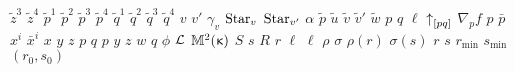 \documentclass[oneside]{book}
\begin{document}
$\tilde z^3$%
\stopmpxshipout
\mpxshipout%
$\tilde z^4$%
\stopmpxshipout
\mpxshipout%
$\tilde p^1$%
\stopmpxshipout
\mpxshipout%
$\tilde p^2$%
\stopmpxshipout
\mpxshipout%
$\tilde p^3$%
\stopmpxshipout
\mpxshipout%
$\tilde p^4$%
\stopmpxshipout
\mpxshipout%
$\tilde q^1$%
\stopmpxshipout
\mpxshipout%
$\tilde q^2$%
\stopmpxshipout
\mpxshipout%
$\tilde q^3$%
\stopmpxshipout
\mpxshipout%
$\tilde q^4$%
\stopmpxshipout
\mpxshipout%
$v$%
\stopmpxshipout
\mpxshipout%
$v'$%
\stopmpxshipout
\mpxshipout%
$\gamma_v$%
\stopmpxshipout
\mpxshipout%
$\mathop{\rm Star}\nolimits_v$%
\stopmpxshipout
\mpxshipout%
$\mathop{\rm Star}\nolimits_{v'}$%
\stopmpxshipout
\mpxshipout%
$\alpha$%
\stopmpxshipout
\mpxshipout%
$\tilde p$%
\stopmpxshipout
\mpxshipout%
$\tilde u$%
\stopmpxshipout
\mpxshipout%
$\tilde v$%
\stopmpxshipout
\mpxshipout%
$\tilde v'$%
\stopmpxshipout
\mpxshipout%
$\tilde w$%
\stopmpxshipout
\mpxshipout%
$p$%
\stopmpxshipout
\mpxshipout%
$q$%
\stopmpxshipout
\mpxshipout%
$\ell$%
\stopmpxshipout
\mpxshipout%
${\uparrow}_{[{p}{q}]}$%
\stopmpxshipout
\mpxshipout%
$\nabla_p f$%
\stopmpxshipout
\mpxshipout%
$p$%
\stopmpxshipout
\mpxshipout%
$\bar p$%
\stopmpxshipout
\mpxshipout%
$x^i$%
\stopmpxshipout
\mpxshipout%
$\bar x^i$%
\stopmpxshipout
\mpxshipout%
$x$%
\stopmpxshipout
\mpxshipout%
$y$%
\stopmpxshipout
\mpxshipout%
$z$%
\stopmpxshipout
\mpxshipout%
$p$%
\stopmpxshipout
\mpxshipout%
$q$%
\stopmpxshipout
\mpxshipout%
$p$%
\stopmpxshipout
\mpxshipout%
$y$%
\stopmpxshipout
\mpxshipout%
$z$%
\stopmpxshipout
\mpxshipout%
$w$%
\stopmpxshipout
\mpxshipout%
$q$%
\stopmpxshipout
\mpxshipout%
$\phi$%
\stopmpxshipout
\mpxshipout%
$\mathcal{L}$%
\stopmpxshipout
\mpxshipout%
$\mathbb{M}_{{}}^{2}({\upkappa})$%
\stopmpxshipout
\mpxshipout%
$S$%
\stopmpxshipout
\mpxshipout%
$s$%
\stopmpxshipout
\mpxshipout%
$R$%
\stopmpxshipout
\mpxshipout%
$r$%
\stopmpxshipout
\mpxshipout%
$\ell$%
\stopmpxshipout
\mpxshipout%
$\ell$%
\stopmpxshipout
\mpxshipout%
$\rho$%
\stopmpxshipout
\mpxshipout%
$\sigma$%
\stopmpxshipout
\mpxshipout%
$\rho(r)$%
\stopmpxshipout
\mpxshipout%
$\sigma(s)$%
\stopmpxshipout
\mpxshipout%
$r$%
\stopmpxshipout
\mpxshipout%
$s$%
\stopmpxshipout
\mpxshipout%
$r_{\min}$%
\stopmpxshipout
\mpxshipout%
$s_{\min}$%
\stopmpxshipout
\mpxshipout%
$(r_0,s_0)$%
\stopmpxshipout
\end{document}

